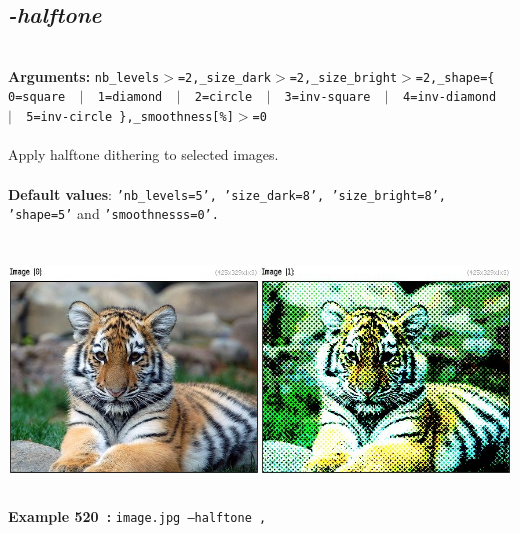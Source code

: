 \documentclass[a4paper,11pt,twoside]{book}
\begin{document}
\subsection{\emph{-halftone} }\vspace*{-0.5em}
~\\\textbf{Arguments: } 
{\small \texttt{nb\_levels$>$=2,\_size\_dark$>$=2,\_size\_bright$>$=2,\_shape=\{ 0=square ~$|$~ 1=diamond ~$|$~ 2=circle ~$|$~ 3=inv-square ~$|$~ 4=inv-diamond ~$|$~ 5=inv-circle \},\_smoothness[\%]$>$=0}}\\~\\
Apply halftone dithering to selected images.
~\\~\\\textbf{Default values}: {\small \texttt{'nb\_levels=5', 'size\_dark=8', 'size\_bright=8', 'shape=5'} and \texttt{'smoothnesss=0'.}}
\begin{center}\includegraphics[keepaspectratio=true,height=7cm,width=\textwidth]{img/gmic_def520.jpg}\\
{\footnotesize \textbf{Example 520~:} \texttt{image.jpg --halftone ,}}
\end{center}
\end{document}

